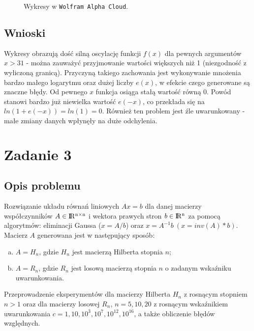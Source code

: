 \documentclass{classrep}
\begin{document}
		\begin{figure}[hpbt]
			\centering
			 \hfill
  			\caption{Wykresy w \texttt{Wolfram Alpha Cloud}.}
  			\label{fig:3}
		\end{figure}
		
	\subsection{Wnioski}
		Wykresy obrazują dość silną oscylację funkcji $f(x)$ dla pewnych argumentów $x > 31$ - można zauważyć przyjmowanie wartości większych niż 1 (niezgodność z wyliczoną granicą). Przyczyną takiego zachowania jest wykonywanie mnożenia bardzo małego logarytmu oraz dużej liczby $e(x)$, w efekcie czego generowane są znaczne błędy. Od pewnego $x$ funkcja osiąga stałą wartość równą 0. Powód stanowi bardzo już niewielka wartość $e(-x)$, co przekłada się na $ln(1+e(-x))=ln(1)=0$. Również ten problem jest źle uwarunkowany - małe zmiany danych wpłynęły na duże odchylenia.
		
\section{Zadanie 3}
	\subsection{Opis problemu}
		Rozwiązanie układu równań liniowych $Ax = b$ dla danej macierzy współczynników $A \in {\rm I\!R^{n \times n}}$ i wektora prawych stron $b \in {\rm I\!R^n}$ za pomocą algorytmów: eliminacji Gaussa ($x=A/b$) oraz $x = A^{-1}b ~(x=inv(A)*b)$. 
		Macierz $A$ generowana jest w następujący sposób:
		\begin{enumerate}[(a)]
			\item $A = H_n$, gdzie $H_n$ jest macierzą Hilberta stopnia $n$;
			\item $A = R_n$, gdzie $R_n$ jest losową macierzą stopnia $n$ o zadanym wskaźniku uwarunkowania.
		\end{enumerate}
		Przeprowadzenie eksperymentów dla macierzy Hilberta $H_n$ z rosnącym stopniem $n > 1$ oraz dla macierzy losowej $R_n$, $n = 5, 10, 20$ z rosnącym wskaźnikiem uwarunkowania $c = 1, 10, 10^3, 10^7, 10^{12}, 10^{16}$, a także obliczenie błędów względnych.
\end{document}
